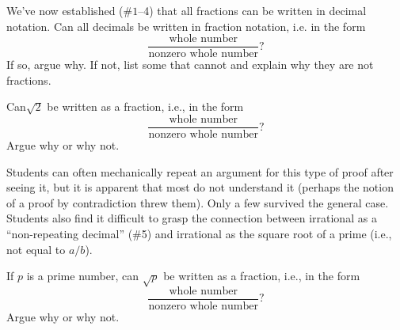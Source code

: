 \documentclass{ximera}
\begin{document}
\begin{problem}
We've now established ($\#1$--4) that all fractions can be written in
decimal notation.  Can all decimals be written in fraction notation,
i.e. in the form \[ \frac{\text{whole number}}{\text{nonzero whole
    number}}?\] If so, argue why.  If not, list some that cannot and
explain why they are not fractions.

\end{problem}

\begin{problem}
Can$\sqrt{2}$ be written as a fraction, i.e., in the form 
\[ 
\frac{\text{whole number}}{\text{nonzero whole number}}?
\] 
Argue why or why not. 
\begin{instructorNotes}
Students can often mechanically repeat an argument for this type of proof after seeing it, but it is apparent that most do not understand it (perhaps the notion of a proof by contradiction threw them).  Only a few survived the general case.  Students also find it difficult to grasp the connection between irrational as a ``non-repeating decimal'' (\#5) and irrational as the square root of a prime (i.e., not equal to $a/b$).
\end{instructorNotes}

\end{problem}

\begin{problem}
If $p$ is a prime number, can $\sqrt{p}$ be written as a fraction,
i.e., in the form 
\[ 
\frac{\text{whole number}}{\text{nonzero whole number}}?
\] 
Argue why or why not.
\end{problem} 
\end{document}
